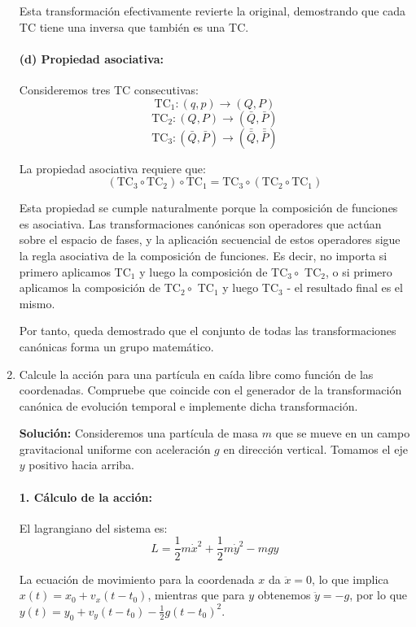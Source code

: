 \documentclass[12pt]{article}
\begin{document}
\begin{enumerate}
  Esta transformación efectivamente revierte la original, demostrando que cada TC tiene una inversa que también es una TC.

  \paragraph{(d) Propiedad asociativa:}

  Consideremos tres TC consecutivas:
  \[
  \text{TC}_1: (q,p) \to (Q,P)
  \]
  \[
  \text{TC}_2: (Q,P) \to (\bar{Q},\bar{P})
  \]
  \[
  \text{TC}_3: (\bar{Q},\bar{P}) \to (\bar{\bar{Q}},\bar{\bar{P}})
  \]

  La propiedad asociativa requiere que:
  \[
  (\text{TC}_3 \circ \text{TC}_2) \circ \text{TC}_1 = \text{TC}_3 \circ (\text{TC}_2 \circ \text{TC}_1)
  \]

  Esta propiedad se cumple naturalmente porque la composición de funciones es asociativa. Las transformaciones canónicas son operadores que actúan sobre el espacio de fases, y la aplicación secuencial de estos operadores sigue la regla asociativa de la composición de funciones. Es decir, no importa si primero aplicamos TC$_1$ y luego la composición de TC$_3 \circ$ TC$_2$, o si primero aplicamos la composición de TC$_2 \circ$ TC$_1$ y luego TC$_3$ - el resultado final es el mismo.

  Por tanto, queda demostrado que el conjunto de todas las transformaciones canónicas forma un grupo matemático.

  \item Calcule la acción para una partícula en caída libre como función de las coordenadas. 
      Compruebe que coincide con el generador de la transformación canónica de evolución temporal 
      e implemente dicha transformación.

  \textbf{Solución:}
  Consideremos una partícula de masa $m$ que se mueve en un campo gravitacional uniforme con aceleración $g$ en dirección vertical. Tomamos el eje $y$ positivo hacia arriba.

  \paragraph{1. Cálculo de la acción:}

  El lagrangiano del sistema es:
  \[
  L = \frac{1}{2}m\dot{x}^2 + \frac{1}{2}m\dot{y}^2 - mgy
  \]

  La ecuación de movimiento para la coordenada $x$ da $\ddot{x}=0$, lo que implica $x(t) = x_0 + v_x(t-t_0)$, mientras que para $y$ obtenemos $\ddot{y}=-g$, por lo que $y(t) = y_0 + v_y(t-t_0) - \frac{1}{2}g(t-t_0)^2$.


\end{enumerate}
\end{document}
